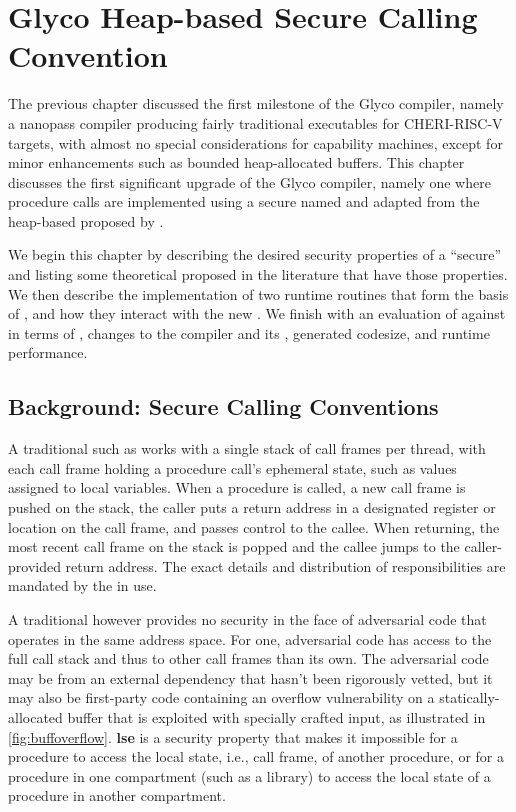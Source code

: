 \documentclass[main.tex]{subfiles}
\begin{document}
\onlyinsubfile{\mainmatter{}}

\chapter{Glyco Heap-based Secure Calling Convention}
The previous chapter discussed the first milestone of the Glyco compiler, namely a nanopass compiler producing fairly traditional executables for CHERI-RISC-V targets, with almost no special considerations for capability machines, except for minor enhancements such as bounded heap-allocated buffers. This chapter discusses the first significant upgrade of the Glyco compiler, namely one where procedure calls are implemented using a secure  named \textbf{} and adapted from the heap-based  proposed by \cite{cerise}.

We begin this chapter by describing the desired security properties of a \enquote{secure}  and listing some theoretical  proposed in the literature that have those properties. We then describe the implementation of two runtime routines that form the basis of , and how they interact with the new . We finish with an evaluation of  against  in terms of , changes to the compiler and its , generated codesize, and runtime performance.

\section{Background: Secure Calling Conventions}
A traditional  such as  works with a single stack of call frames per thread, with each call frame holding a procedure call's ephemeral state, such as values assigned to local variables. When a procedure is called, a new call frame is pushed on the stack, the caller puts a return address in a designated register or location on the call frame, and passes control to the callee. When returning, the most recent call frame on the stack is popped and the callee jumps to the caller-provided return address. The exact details and distribution of responsibilities are mandated by the  in use.

A traditional  however provides no security in the face of adversarial code that operates in the same address space. For one, adversarial code has access to the full call stack and thus to other call frames than its own. The adversarial code may be from an external dependency that hasn't been rigorously vetted, but it may also be first-party code containing an overflow vulnerability on a statically-allocated buffer that is exploited with specially crafted input, as illustrated in \cref{fig:buffoverflow}. \textbf{\Gls{lse}} is a security property that makes it impossible for a procedure to access the local state, i.e., call frame, of another procedure, or for a procedure in one compartment (such as a library) to access the local state of a procedure in another compartment.
\end{document}
